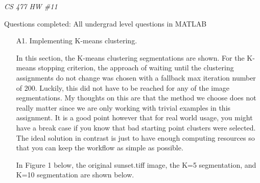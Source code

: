 \documentclass[12pt]{report}
\begin{document}
\centerline{\it CS 477 HW \#11}
\centerline{Questions completed: All undergrad level questions in MATLAB}

\begin{enumerate}

\item[A1.] Implementing K-means clustering.

  In this section, the K-means clustering segmentations are shown. For the
  K-means stopping criterion, the approach of waiting until the clustering
  assignments do not change was chosen with a fallback max iteration number of
  200. Luckily, this did not have to be reached for any of the image
  segmentations. My thoughts on this are that the method we choose does not
  really matter since we are only working with trivial examples in this
  assignment. It is a good point however that for real world usage, you might
  have a break case if you know that bad starting point clusters were
  selected. The ideal solution in contrast is just to have enough computing
  resources so that you can keep the workflow as simple as possible.

  \newpage
  In Figure 1 below, the original sunset.tiff image, the K=5 segmentation, and
  K=10 segmentation are shown below.


\end{enumerate}
\end{document}
